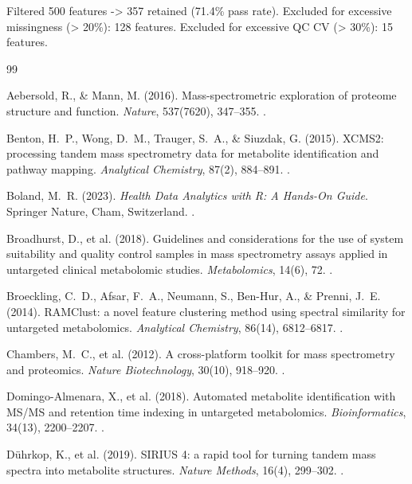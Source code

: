 \documentclass[11pt,twoside,openright]{book}
\begin{document}
\begin{routput} Filtered 500 features -> 357 retained (71.4\% pass rate).
Excluded for excessive missingness (> 20\%): 128 features.
Excluded for excessive QC CV (> 30\%): 15 features.
\end{routput}

\begin{thebibliography}{99}

Aebersold, R., \& Mann, M. (2016). Mass-spectrometric exploration of proteome structure and function. \textit{Nature}, 537(7620), 347--355. .

Benton, H.~P., Wong, D.~M., Trauger, S.~A., \& Siuzdak, G. (2015). XCMS2: processing tandem mass spectrometry data for metabolite identification and pathway mapping. \textit{Analytical Chemistry}, 87(2), 884--891. .

Boland, M.~R. (2023). \textit{Health Data Analytics with R: A Hands-On Guide}. Springer Nature, Cham, Switzerland. .

Broadhurst, D., et al. (2018). Guidelines and considerations for the use of system suitability and quality control samples in mass spectrometry assays applied in untargeted clinical metabolomic studies. \textit{Metabolomics}, 14(6), 72. .

Broeckling, C.~D., Afsar, F.~A., Neumann, S., Ben-Hur, A., \& Prenni, J.~E. (2014). RAMClust: a novel feature clustering method using spectral similarity for untargeted metabolomics. \textit{Analytical Chemistry}, 86(14), 6812--6817. .

Chambers, M.~C., et al. (2012). A cross-platform toolkit for mass spectrometry and proteomics. \textit{Nature Biotechnology}, 30(10), 918--920. .

Domingo-Almenara, X., et al. (2018). Automated metabolite identification with MS/MS and retention time indexing in untargeted metabolomics. \textit{Bioinformatics}, 34(13), 2200--2207. .

D\"uhrkop, K., et al. (2019). SIRIUS 4: a rapid tool for turning tandem mass spectra into metabolite structures. \textit{Nature Methods}, 16(4), 299--302. .


\end{thebibliography}
\end{document}
